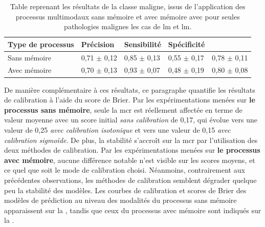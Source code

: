 \begin{table}[H]
    \centering
    \begin{tabular}{lllll}
        \toprule 
        Type de processus   & Précision             & Sensibilité           & Spécificité           & \Fscore{}             \\ \midrule
        Sans mémoire        & 0,71 $\pm$ 0,12 	    & 0,85 $\pm$ 0,13 	    & 0,55 $\pm$ 0,17 	    & 0,78 $\pm$ 0,11         \\ \midrule
        Avec mémoire        & 0,70 $\pm$ 0,13 	    & 0,93 $\pm$ 0,07 	    & 0,48 $\pm$ 0,19 	    & 0,80 $\pm$ 0,08         \\ \bottomrule
    \end{tabular}
    \caption{Table reprenant les résultats de la classe maligne, issus de l'application des processus multimodaux sans mémoire et avec mémoire avec pour seules pathologies malignes les cas de \gls{lm} et \gls{lm}.}
    \label{tab:results_multimodal_process_lm}
\end{table}

De manière complémentaire à ces résultats, ce paragraphe quantifie les résultats de calibration à l'aide du score de Brier. Par les expérimentations menées sur \textbf{le processus sans mémoire}, seule la \gls{mcr} est réellement affectée en terme de valeur moyenne avec un score initial \textit{sans calibration} de 0,17, qui évolue vers une valeur de 0,25 \textit{avec calibration isotonique} et vers une valeur de 0,15 \textit{avec calibration sigmoïde}. De plus, la stabilité s'accroît sur la \gls{mcr} par l'utilisation des deux méthodes de calibration. Par les expérimentations menées sur \textbf{le processus avec mémoire}, aucune différence notable n'est visible sur les scores moyens, et ce quel que soit le mode de calibration choisi. Néanmoins, contrairement aux précédentes observations, les méthodes de calibration semblent dégrader quelque peu la stabilité des modèles. Les courbes de calibration et scores de Brier des modèles de prédiction au niveau des modalités du processus sans mémoire apparaissent sur la , tandis que ceux du processus avec mémoire sont indiqués sur la .\par


